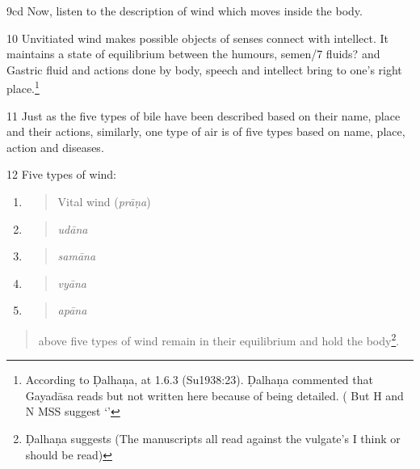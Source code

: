 \begin{translation}
\item[9cd] Now, listen to the description of wind which moves inside the
body.
                    
\item[10] Unvitiated wind makes possible objects of senses connect with
intellect. It maintains a state of equilibrium between the humours,
semen/7 fluids? and Gastric fluid and actions done by body, speech and
intellect bring to one's right place.\footnote{ According to Ḍalhaṇa,
     at 1.6.3 (Su1938:23). Ḍalhaṇa commented that
    Gayadāsa reads  but not written here
    because of being detailed. ( But H and N MSS suggest  
    `'}

\item[11] Just as the five types of bile have been described based 
on their
name, place and their actions, similarly, one type of air is of five
types based on name, place, action and diseases.

\item[12] Five types of wind:

\begin{enumerate}
    \def\labelenumi{\arabic{enumi}.}
    \item
    \begin{quote}
        Vital wind (\emph{prāṇa})
    \end{quote}
    \item
    \begin{quote}
        \emph{udāna }
    \end{quote}
    \item
    \begin{quote}
        \emph{samāna}
    \end{quote}
    \item
    \begin{quote}
        \emph{vyāna}
    \end{quote}
    \item
    \begin{quote}
        \emph{apāna}
    \end{quote}
\end{enumerate}

\begin{quote}
    above five types of wind remain in their equilibrium and hold the
body\footnote{ Ḍalhaṇa suggests 
    (The manuscripts all read        against the vulgate's  I think  or  should be read)}.
    \end{quote}
    

\end{translation}
